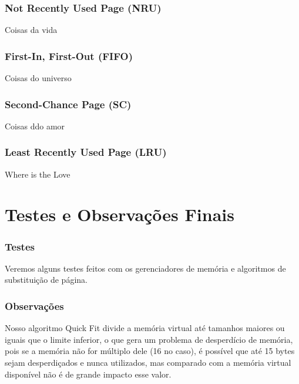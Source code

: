 \documentclass{beamer}
\begin{document}

\begin{frame}
\frametitle{Not Recently Used Page (NRU)}
Coisas da vida
\end{frame}


\begin{frame}
\frametitle{First-In, First-Out (FIFO)}
Coisas do universo
\end{frame}


\begin{frame}
\frametitle{Second-Chance Page (SC)}
Coisas ddo amor
\end{frame}


\begin{frame}
\frametitle{Least Recently Used Page (LRU)}
Where is the Love
\end{frame}

\section{Testes e Observações Finais}

\begin{frame}
  \frametitle{Testes}
  Veremos alguns testes feitos com os gerenciadores de memória e algoritmos de substituição de página.
\end{frame}


\begin{frame}
  \frametitle{Observações}
  Nosso algoritmo Quick Fit divide a memória virtual até tamanhos maiores ou iguais que o limite inferior, o que gera um problema de desperdício de memória, pois se a memória não for múltiplo dele (16 no caso),
  é possível que até 15 bytes sejam desperdiçados e nunca utilizados, mas comparado com a memória virtual disponível não é de grande impacto esse valor.
\end{frame}
\end{document}
